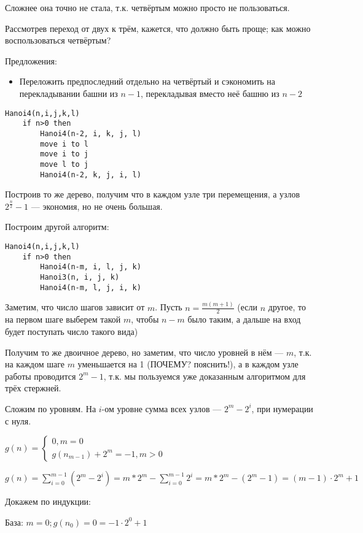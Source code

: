 \documentclass[12pt,a4paper]{article}
\begin{document}
Сложнее она точно не стала, т.к. четвёртым можно просто не пользоваться.

Рассмотрев переход от двух к трём, кажется, что должно быть проще; как можно воспользоваться четвёртым?

Предложения:
\begin{itemize}
    \item Переложить предпоследний отдельно на четвёртый и сэкономить на перекладывании башни из $n-1$, перекладывая вместо неё башню из $n-2$
\end{itemize}


\begin{lstlisting}
Hanoi4(n,i,j,k,l)
    if n>0 then
        Hanoi4(n-2, i, k, j, l)
        move i to l
        move i to j
        move l to j
        Hanoi4(n-2, k, j, i, l)
\end{lstlisting}

Построив то же дерево, получим что в каждом узле три перемещения, а узлов $2^{\frac{n}2}-1$ --- экономия, но не очень большая.

Построим другой алгоритм:

\begin{lstlisting}
Hanoi4(n,i,j,k,l)
    if n>0 then
        Hanoi4(n-m, i, l, j, k)
        Hanoi3(n, i, j, k)
        Hanoi4(n-m, l, j, i, k)
\end{lstlisting}

Заметим, что число шагов зависит от $m$. Пусть $n=\frac{m(m+1)}{2}$ (если $n$ другое, то на первом шаге выберем такой $m$, чтобы $n-m$ было таким, а дальше на вход будет поступать число такого вида)

Получим то же двоичное дерево, но заметим, что число уровней в нём --- $m$, т.к. на каждом шаге $m$ уменьшается на 1 (ПОЧЕМУ? пояснить!), а в каждом узле работы проводится $2^m-1$, т.к. мы пользуемся уже доказанным алгоритмом для трёх стержней.

Сложим по уровням. На $i$-ом уровне сумма всех узлов --- $2^m-2^i$, при нумерации с нуля.

$g(n) = \begin{cases}
    0, m=0\\
    g(n_{m-1})+2^m=-1, m>0
\end{cases}$

$g(n) = \sum\limits_{i=0}^{m-1}(2^m-2^i) = m*2^m-\sum\limits_{i=0}^{m-1}2^i =
m*2^m-(2^m-1) = (m-1)\cdot2^m+1 $

Докажем по индукции:

База: $m=0; g(n_0) = 0 = -1\cdot2^0+1$
\end{document}
